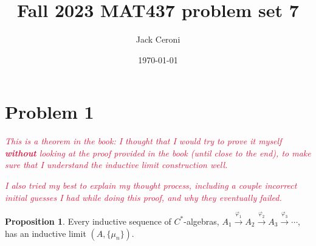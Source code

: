 \documentclass[aps,pra,showpacs,notitlepage,onecolumn,superscriptaddress,nofootinbib]{revtex4-1}
\newcommand{\pop}[1]{\textcolor{crimson}{#1}}
\newcommand{\hhrulefill}{\hspace{-1.0em}\hrulefill}
\theoremstyle{definition}
\newtheorem{proposition}{Proposition}[section]
\begin{document}
\title{Fall 2023 MAT437 problem set 7}
\author{Jack Ceroni}

\date{\today}

\maketitle

\hhrulefill

\section{Problem 1}

\noindent \emph{\pop{This is a theorem in the book: I thought that I would try to prove it myself \textbf{without} looking at the proof provided in the book (until close to the end), to make sure that I understand the inductive limit construction well.}}
\newline

  \noindent \emph{\pop{I also tried my best to explain my thought process, including a couple incorrect initial guesses I had while doing this proof, and why they eventually failed.}}
\newline

\begin{proposition}
  Every inductive sequence of $C^{*}$-algebras, $A_1 \xrightarrow{\varphi_1} A_2 \xrightarrow{\varphi_2} A_3 \xrightarrow{\varphi_3} \cdots$, has an inductive limit $(A, \{\mu_n\})$.
\end{proposition}
\end{document}
